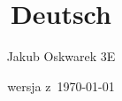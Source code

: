 \documentclass[oneside, a4paper]{report}
\title{Deutsch}
\author{Jakub Oskwarek 3E}
\date{wersja z~\today}
\begin{document}
    \noindent
    
    
    
    
    
    
    
\end{document}
